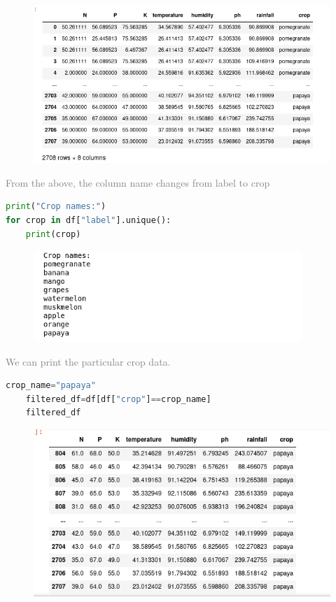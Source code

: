 \begin{figure}[ht]
    \centering
    \includegraphics[width=7in]{rename.png}
\end{figure}
\textcolor{grey}{\hspace{0.5cm}From the above, the column name changes from label to crop}
\newline
\begin{lstlisting}[language=Python]
print("Crop names:")
for crop in df["label"].unique():
    print(crop)
\end{lstlisting}
\begin{figure}[ht]
    \centering
    \includegraphics[width=4in]{crop.png}
\end{figure}
\vspace{5\baselineskip}
\textcolor{grey}{\hspace{0.5cm}We can print the particular crop data.}

\begin{lstlisting}[language=Python]
    crop_name="papaya"
    filtered_df=df[df["crop"]==crop_name]
    filtered_df
\end{lstlisting}

\begin{figure}[ht]
    \centering
    \includegraphics[width=5in]{particular.png}
\end{figure}
